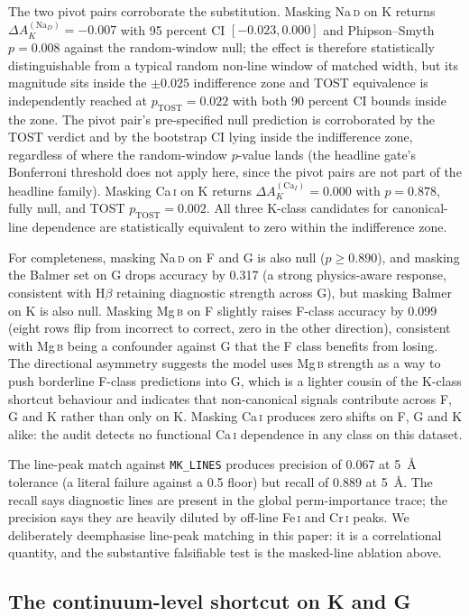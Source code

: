 \documentclass[11pt,a4paper]{article}
\newcommand{\Hbeta}{H$\beta$\xspace}
\newcommand{\Mgb}{Mg\,\textsc{b}\xspace}
\newcommand{\NaD}{Na\,\textsc{d}\xspace}
\newcommand{\CaI}{Ca\,\textsc{i}\xspace}
\newcommand{\FeI}{Fe\,\textsc{i}\xspace}
\newcommand{\CrI}{Cr\,\textsc{i}\xspace}
\newcommand{\dA}{\Delta A}
\begin{document}
The two pivot pairs corroborate the substitution. Masking \NaD on K returns $\dA_K^{(\mathrm{Na}_D)} = -0.007$ with 95 percent CI $[-0.023, 0.000]$ and Phipson--Smyth $p = 0.008$ against the random-window null; the effect is therefore statistically distinguishable from a typical random non-line window of matched width, but its magnitude sits inside the $\pm 0.025$ indifference zone and TOST equivalence is independently reached at $p_{\mathrm{TOST}} = 0.022$ with both 90 percent CI bounds inside the zone. The pivot pair's pre-specified null prediction is corroborated by the TOST verdict and by the bootstrap CI lying inside the indifference zone, regardless of where the random-window $p$-value lands (the headline gate's Bonferroni threshold does not apply here, since the pivot pairs are not part of the headline family). Masking \CaI on K returns $\dA_K^{(\mathrm{Ca}_I)} = 0.000$ with $p = 0.878$, fully null, and TOST $p_{\mathrm{TOST}} = 0.002$. All three K-class candidates for canonical-line dependence are statistically equivalent to zero within the indifference zone.

For completeness, masking \NaD on F and G is also null ($p \geq 0.890$), and masking the Balmer set on G drops accuracy by 0.317 (a strong physics-aware response, consistent with \Hbeta retaining diagnostic strength across G), but masking Balmer on K is also null. Masking \Mgb on F slightly raises F-class accuracy by 0.099 (eight rows flip from incorrect to correct, zero in the other direction), consistent with \Mgb being a confounder against G that the F class benefits from losing. The directional asymmetry suggests the model uses \Mgb strength as a way to push borderline F-class predictions into G, which is a lighter cousin of the K-class shortcut behaviour and indicates that non-canonical signals contribute across F, G and K rather than only on K. Masking \CaI produces zero shifts on F, G and K alike: the audit detects no functional \CaI dependence in any class on this dataset.

The line-peak match against \texttt{MK\_LINES} produces precision of 0.067 at 5~\AA{} tolerance (a literal failure against a 0.5 floor) but recall of 0.889 at 5~\AA{}. The recall says diagnostic lines are present in the global perm-importance trace; the precision says they are heavily diluted by off-line \FeI and \CrI peaks. We deliberately deemphasise line-peak matching in this paper: it is a correlational quantity, and the substantive falsifiable test is the masked-line ablation above.

\subsection{The continuum-level shortcut on K and G}
\label{subsec:continuum-shortcut}
\end{document}
